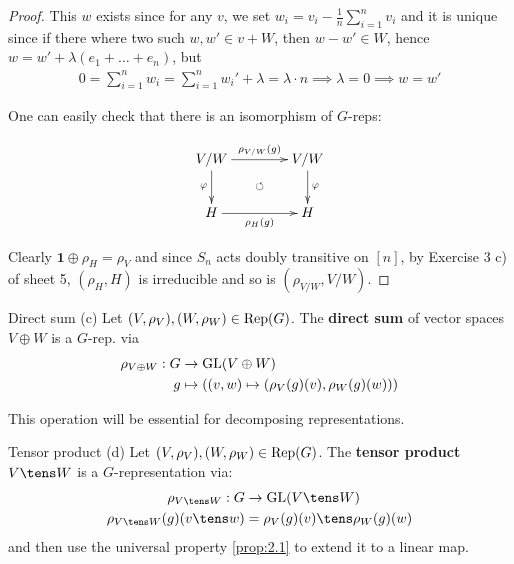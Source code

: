 \documentclass[twoside = false,	%
		headsepline,		%
		parskip = true,
		]{scrbook}						%
\begin{document}
\begin{proof}
        This $w$ exists since for any $v$, we set $w_i = v_i - \frac{1}{n}\sum_{i=1}^n v_i$ and it is unique since if there where two such $w,w' \in v +W$, then $w-w' \in W$, hence $w = w' + \lambda (e_1 + \dots + e_n)$, but
        \begin{equation*}
        \begin{split}
            0 = \sum_{i=1}^n w_i = \sum_{i=1}^n w_i' + \lambda = \lambda \cdot n \implies \lambda = 0 \implies w = w'
        \end{split}
        \end{equation*}
        
        One can easily check that there is an isomorphism of $G$-reps:
        
        \begin{equation*}
        \xymatrix@C=40pt {
            V/W \ar^{\rho_{V/W}(g)}[r] \ar[d]_{\varphi} & V/W\ar[d]^{\varphi} \\
            H \ar[r]_{\rho_H(g)} & H\ar@{}|{\circlearrowleft}[ul]
        }
        \end{equation*}
        
        Clearly $\mathbf{1} \oplus \rho_H = \rho_V$ and since $S_n$ acts doubly transitive on $[n]$, by Exercise 3 c) of sheet 5, $(\rho_H,H)$ is irreducible and so is $(\rho_{V/W},V/W)$.
    \end{proof}
     
    \begin{definition*}
    {Direct sum (c)}
        Let $(V,\rho_V), (W,\rho_W) \in \mathrm{Rep}(G)$. The \textbf{direct sum} of vector spaces $V \oplus W$ is a $G$-rep. via
        \begin{equation*}
        \begin{split}
            \rho_{V \oplus W}: G &\to \mathrm{GL}(V \oplus W) \\
                            g &\mapsto \left( (v,w) \mapsto (\rho_V(g)(v),\rho_W(g)(w))\right)
        \end{split}
        \end{equation*}
    \end{definition*}
    This operation will be essential for decomposing representations.
    
    \begin{definition*}
    {Tensor product (d)}
        Let $(V,\rho_V), (W,\rho_W) \in \mathrm{Rep}(G)$. The \textbf{tensor product} $V \tens W$ is a $G$-representation via:
        \begin{equation*}
        \begin{split}
            \rho_{V \tens W}: G &\to \GL(V \tens W) \\
                    \rho_{V \tens W}(g)(v \tens w) &= \rho_V(g)(v) \tens \rho_W(g)(w)
        \end{split}
        \end{equation*}
        and then use the universal property \ref{prop:2.1} to extend it to a linear map.
    \end{definition*}
\end{document}
